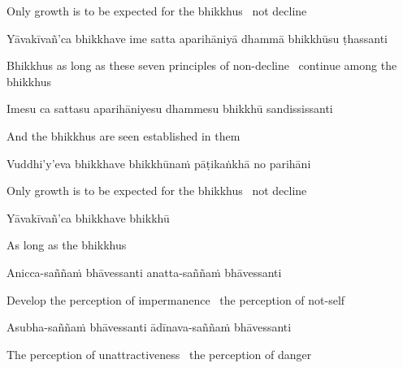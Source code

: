 \begin{english-hang}
  Only growth is to be expected for the bhikkhus \breathmark\ not decline
\end{english-hang}

\begin{pali-hang}
  Yāvakīvañ'ca bhikkhave ime satta aparihāniyā dhammā bhikkhūsu ṭhassanti
\end{pali-hang}

\begin{english-hang}
  Bhikkhus as long as these seven principles of non-decline \breathmark\ continue among the bhikkhus
\end{english-hang}

\begin{pali-hang}
Imesu ca sattasu aparihāniyesu dhammesu bhikkhū sandississanti
\end{pali-hang}

\begin{english}
  And the bhikkhus are seen established in them
\end{english}

\begin{pali-hang}
Vuddhi'y'eva bhikkhave bhikkhūnaṁ pāṭikaṅkhā no parihāni
\end{pali-hang}

\begin{english-hang}
  Only growth is to be expected for the bhikkhus \breathmark\ not decline
\end{english-hang}

\suttaRef{[AN 7.23]}

Yāvakīvañ'ca bhikkhave bhikkhū

\begin{english}
  As long as the bhikkhus
\end{english}

\begin{pali-hang}
Anicca-saññaṁ bhāvessanti anatta-saññaṁ bhāvessanti
\end{pali-hang}

\begin{english-hang}
  Develop the perception of impermanence \breathmark\ the perception of not-self
\end{english-hang}

\begin{pali-hang}
Asubha-saññaṁ bhāvessanti ādīnava-saññaṁ bhāvessanti
\end{pali-hang}

\begin{english-hang}
  The perception of unattractiveness \breathmark\ the perception of danger
\end{english-hang}

